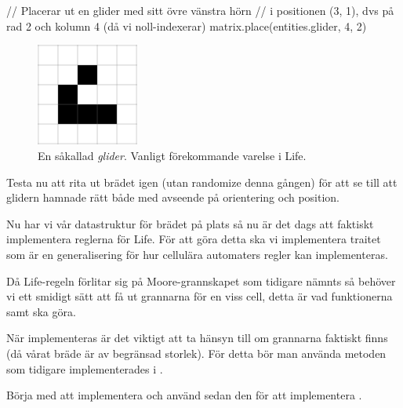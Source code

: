 \begin{Code}
// Placerar ut en glider med sitt övre vänstra hörn
// i positionen (3, 1), dvs på rad 2 och kolumn 4 (då vi noll-indexerar)
matrix.place(entities.glider, 4, 2)
\end{Code}

\begin{figure}[h]
  \begin{center}
    \includegraphics[width=0.3\textwidth]{../img/w12-lab/glider.png}
  \end{center}
  \caption{En såkallad \textit{glider}. Vanligt förekommande varelse i Life.}
\end{figure}

        Testa nu att rita ut brädet igen (utan randomize denna gången) för att se till att glidern hamnade rätt både med avseende på orientering och position.


    
    Nu har vi vår datastruktur för brädet på plats så nu är det dags att faktiskt implementera reglerna för Life. För att göra detta ska vi implementera traitet  som är en generalisering för hur cellulära automaters regler kan implementeras.
    
        
        Då Life-regeln förlitar sig på Moore-grannskapet som tidigare nämnts så behöver vi ett smidigt sätt att få ut grannarna för en viss cell, detta är vad funktionerna  samt  ska göra.
        
        När  implementeras är det viktigt att ta hänsyn till om grannarna faktiskt finns (då vårat bräde är av begränsad storlek).
        För detta bör man använda  metoden som tidigare implementerades i .
        
        Börja med att implementera  och använd sedan den för att implementera .

